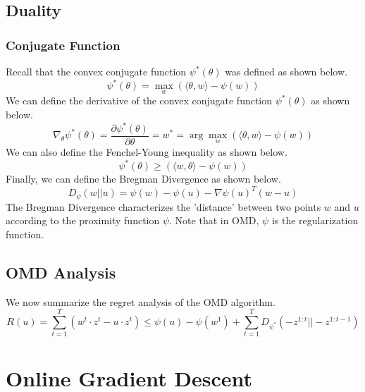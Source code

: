 \documentclass[11pt]{article}
\begin{document}
\subsection{Duality}
\subsubsection{Conjugate Function}
Recall that the convex conjugate function $\psi^*(\theta)$ was defined as shown below.
\[ \psi^*(\theta) = \max_w (\langle \theta, w \rangle - \psi(w)) \]
We can define the derivative of the convex conjugate function $\psi^*(\theta)$ as shown below.
\[ \nabla_\theta \psi^*(\theta) = \frac{\partial \psi^*(\theta)}{\partial \theta} = w^* = \arg\max_w (\langle \theta, w \rangle - \psi(w)) \]
We can also define the Fenchel-Young inequality as shown below.
\[ \psi^*(\theta) \geq (\langle w , \theta \rangle - \psi(w)) \]
Finally, we can define the Bregman Divergence as shown below.
\[ D_\psi(w||u) = \psi(w) - \psi(u) - \nabla\psi(u)^T(w-u) \]
The Bregman Divergence characterizes the 'distance' between two points $w$ and $u$ according to the proximity function $\psi$. Note that in OMD, $\psi$ is the regularization function.

\subsection{OMD Analysis}
We now summarize the regret analysis of the OMD algorithm.
\[ R(u) = \sum_{t=1}^T (w^t \cdot z^t - u \cdot z^t) \leq \psi(u) - \psi(w^1) + \sum_{t=1}^T D_{\psi^*}(-z^{1:t}||-z^{1:t-1}) \]

\section{Online Gradient Descent}
\end{document}
